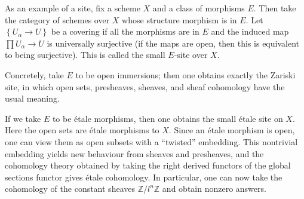 \documentclass[12pt]{article}
\begin{document}

As an example of a site, fix a scheme $X$ and a class of morphisms $E$. Then take the category of schemes over $X$ whose structure morphism is in $E$. Let $\left\{U_\alpha\to U\right\}$ be a covering if all the morphisms are in $E$ and the induced map $\prod U_\alpha \to U$ is universally surjective (if the maps are open, then this is equivalent to being surjective). This is called the small $E$-site over $X$.
 
Concretely, take $E$ to be open immersions; then one obtains exactly the Zariski site, in which open sets, presheaves, sheaves, and sheaf cohomology have the usual meaning. 

If we take $E$ to be \'etale morphisms, then one obtains the small \'etale site on $X$. Here the open sets are \'etale morphisms to $X$. Since an \'etale morphism is open, one can view them as open subsets with a ``twisted'' embedding. This nontrivial embedding yields new behaviour from sheaves and presheaves, and the cohomology theory obtained by taking the right derived functors of the global sections functor gives \'etale cohomology. In particular, one can now take the cohomology of the constant sheaves $\mathbb{Z}/l^n\mathbb{Z}$ and obtain nonzero answers.
\end{document}
